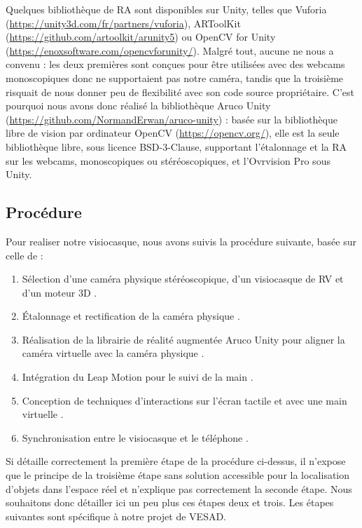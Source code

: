 Quelques bibliothèque de RA sont disponibles sur Unity, telles que Vuforia (\url{https://unity3d.com/fr/partners/vuforia}), ARToolKit (\url{https://github.com/artoolkit/arunity5}) ou OpenCV for Unity (\url{https://enoxsoftware.com/opencvforunity/}). Malgré tout, aucune ne nous a convenu : les deux premières sont conçues pour être utilisées avec des webcams monoscopiques donc ne supportaient pas notre caméra, tandis que la troisième risquait de nous donner peu de flexibilité avec son code source propriétaire. C'est pourquoi nous avons donc réalisé la bibliothèque Aruco Unity (\url{https://github.com/NormandErwan/aruco-unity}) : basée sur la bibliothèque libre de vision par ordinateur OpenCV (\url{https://opencv.org/}), elle est la seule bibliothèque libre, sous licence BSD-3-Clause, supportant l'étalonnage et la RA sur les webcams, monoscopiques ou stéréoscopiques, et l'Ovrvision Pro sous Unity.


\subsection{Procédure}
Pour realiser notre visiocasque, nous avons suivis la procédure suivante, basée sur celle de \cite{Steptoe2013} :
\begin{enumerate}
  \item Sélection d'une caméra physique stéréoscopique, d'un visiocasque de RV et d'un moteur 3D .
  \item Étalonnage et rectification de la caméra physique .
  \item Réalisation de la librairie de réalité augmentée Aruco Unity pour aligner la caméra virtuelle avec la caméra physique .
  \item Intégration du Leap Motion pour le suivi de la main .
  \item Conception de techniques d'interactions sur l'écran tactile et avec une main virtuelle .
  \item Synchronisation entre le visiocasque et le téléphone .
\end{enumerate}

Si \cite{Steptoe2013} détaille correctement la première étape de la procédure ci-dessus, il n'expose que le principe de la troisième étape sans solution accessible pour la localisation d'objets dans l'espace réel et n'explique pas correctement la seconde étape. Nous souhaitons donc détailler ici un peu plus ces étapes deux et trois. Les étapes suivantes sont spécifique à notre projet de VESAD.


